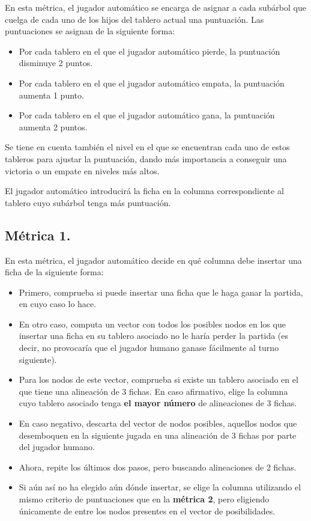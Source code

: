 \documentclass[11pt]{article}
\begin{document}
En esta métrica, el jugador automático se encarga de asignar a cada subárbol que cuelga de cada uno de los hijos del tablero actual una puntuación. Las puntuaciones se asignan de la siguiente forma:

\begin{itemize}
\item Por cada tablero en el que el jugador automático pierde, la puntuación disminuye 2 puntos.
\item Por cada tablero en el que el jugador automático empata, la puntuación aumenta 1 punto.
\item Por cada tablero en el que el jugador automático gana, la puntuación aumenta 2 puntos.
\end{itemize}

Se tiene en cuenta también el nivel en el que se encuentran cada uno de estos tableros para ajustar la puntuación, dando más importancia a conseguir una victoria o un empate en niveles más altos.

El jugador automático introducirá la ficha en la columna correspondiente al tablero cuyo subárbol tenga más puntuación.

\subsection{Métrica 1.}
\label{sec-2-4}

En esta métrica, el jugador automático decide en qué columna debe insertar una ficha de la siguiente forma:

\begin{itemize}
\item Primero, comprueba si puede insertar una ficha que le haga ganar la partida, en cuyo caso lo hace.
\item En otro caso, computa un vector con todos los posibles nodos en los que insertar una ficha en su tablero asociado no le haría perder la partida (es decir, no provocaría que el jugador humano ganase fácilmente al turno siguiente).
\item Para los nodos de este vector, comprueba si existe un tablero asociado en el que tiene una alineación de 3 fichas. En caso afirmativo, elige la columna cuyo tablero asociado tenga \textbf{\textbf{el mayor número}} de alineaciones de 3 fichas.
\item En caso negativo, descarta del vector de nodos posibles, aquellos nodos que desemboquen en la siguiente jugada en una alineación de 3 fichas por parte del jugador humano.
\item Ahora, repite los últimos dos pasos, pero buscando alineaciones de 2 fichas.
\item Si aún así no ha elegido aún dónde insertar, se elige la columna utilizando el mismo criterio de puntuaciones que en la \textbf{\textbf{métrica 2}}, pero eligiendo únicamente de entre los nodos presentes en el vector de posibilidades.
\end{itemize}
\end{document}
